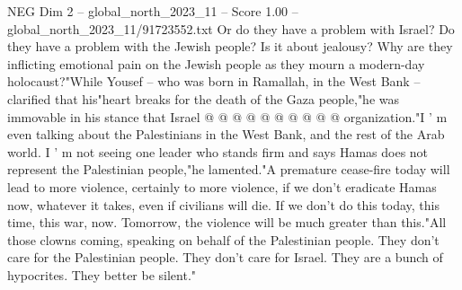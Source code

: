 \begin{textsample}{NEG Dim 2 – global\_north\_2023\_11 – Score 1.00 – global\_north\_2023\_11/91723552.txt}
Or do they have a problem with Israel?
Do they have a problem with the Jewish people?
Is it about jealousy?
Why are they inflicting emotional pain on the Jewish people as they mourn a modern-day holocaust?"While Yousef -- who was born in Ramallah, in the West Bank -- clarified that his"heart breaks for the death of the Gaza people,"he was immovable in his stance that Israel @ @ @ @ @ @ @ @ @ @ organization."I ' m even talking about the Palestinians in the West Bank, and the rest of the Arab world.
I ' m not seeing one leader who stands firm and says Hamas does not represent the Palestinian people,"he lamented."A premature cease-fire today will lead to more violence, certainly to more violence, if we don't eradicate Hamas now, whatever it takes, even if civilians will die.
If we don't do this today, this time, this war, now.
Tomorrow, the violence will be much greater than this."All those clowns coming, speaking on behalf of the Palestinian people.
They don't care for the Palestinian people.
They don't care for Israel.
They are a bunch of hypocrites.
They better be silent."

\end{textsample}
